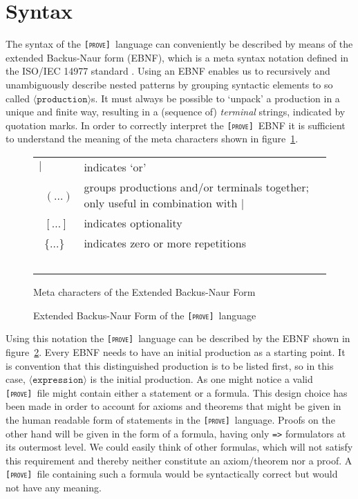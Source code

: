 \documentclass[british]{article}
\newcommand\prv{bc}
\newcommand\m[1]{\texttt{#1}}
\newcommand\name{\texttt{\textsc{[prove]}}}
\providecommand{\tabularnewline}{\\}
\begin{document}
\pagebreak{}

\section{Syntax}

The syntax of the \name\ language can conveniently be described by means of the
extended Backus-Naur form (EBNF), which is a meta syntax notation defined in the
ISO/IEC 14977 standard \parencite{ISO}. Using an EBNF enables us to recursively
and unambiguously describe nested patterns by grouping syntactic elements to so
called $\langle\texttt{production}\rangle$s.  It must always be possible to
`unpack' a production in a unique and finite way, resulting in a (sequence of)
\textit{terminal} strings, indicated by quotation marks. In order to correctly
interpret the \name\ EBNF it is sufficient to understand the meaning of the meta
characters shown in figure~\ref{fig:meta}.

\medskip{}

\begin{figure}[!ht]
\centering
\begin{doublespace}
\begin{tabular}{l|l}
$|$ & indicates `or'\tabularnewline\
$(\dots)$ & groups productions and/or terminals together; only useful in
combination with $|$\tabularnewline\
$[\dots]$ & indicates optionality\tabularnewline\
$\{\dots\}$ & indicates zero or more repetitions\tabularnewline\
\end{tabular}%
\caption{Meta characters of the Extended Backus-Naur Form}\label{fig:meta}
\end{doublespace}
\end{figure}

\begin{figure}[!ht]
\centering

\caption{Extended Backus-Naur Form of the \name\ language}\label{fig:ebnf}
\end{figure}

Using this notation the \name\ language can be described by the EBNF shown in
figure~\ref{fig:ebnf}.  Every EBNF needs to have an initial production as a
starting point.  It is convention that this distinguished production is to be
listed first, so in this case, $\langle\texttt{expression}\rangle$ is the
initial production. As one might notice a valid \name\ file might contain either
a statement or a formula. This design choice has been made in order to account
for axioms and theorems that might be given in the human readable form of
statements in the \name\ language.  Proofs on the other hand will be given in
the form of a formula, having only \m{=>} formulators at its outermost level. We
could easily think of other formulas, which will not satisfy this requirement
and thereby neither constitute an axiom/theorem nor a proof. A \name\ file
containing such a formula would be syntactically correct but would not have any
meaning.
\end{document}
